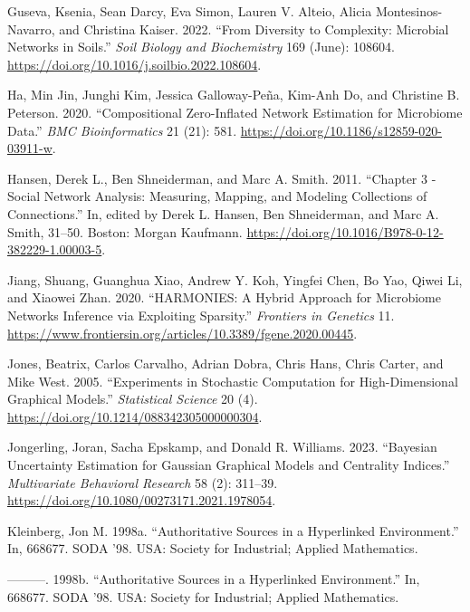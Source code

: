 \documentclass[
  a4paper,
]{article}
\newlength{\cslhangindent}
\newlength{\cslentryspacingunit} %
\newenvironment{CSLReferences}[2] %
 {%
  \setlength{\parindent}{0pt}
  \ifodd #1
  \let\oldpar\par
  \def\par{\hangindent=\cslhangindent\oldpar}
  \fi
  \setlength{\parskip}{#2\cslentryspacingunit}
 }%
 {}
\begin{document}
\begin{CSLReferences}{1}{0}
\leavevmode{}%
Guseva, Ksenia, Sean Darcy, Eva Simon, Lauren V. Alteio, Alicia
Montesinos-Navarro, and Christina Kaiser. 2022. {``From Diversity to
Complexity: Microbial Networks in Soils.''} \emph{Soil Biology and
Biochemistry} 169 (June): 108604.
\url{https://doi.org/10.1016/j.soilbio.2022.108604}.

\leavevmode{}%
Ha, Min Jin, Junghi Kim, Jessica Galloway-Peña, Kim-Anh Do, and
Christine B. Peterson. 2020. {``Compositional Zero-Inflated Network
Estimation for Microbiome Data.''} \emph{BMC Bioinformatics} 21 (21):
581. \url{https://doi.org/10.1186/s12859-020-03911-w}.

\leavevmode{}%
Hansen, Derek L., Ben Shneiderman, and Marc A. Smith. 2011. {``Chapter 3
- Social Network Analysis: Measuring, Mapping, and Modeling Collections
of Connections.''} In, edited by Derek L. Hansen, Ben Shneiderman, and
Marc A. Smith, 31--50. Boston: Morgan Kaufmann.
\url{https://doi.org/10.1016/B978-0-12-382229-1.00003-5}.

\leavevmode{}%
Jiang, Shuang, Guanghua Xiao, Andrew Y. Koh, Yingfei Chen, Bo Yao, Qiwei
Li, and Xiaowei Zhan. 2020. {``HARMONIES: A Hybrid Approach for
Microbiome Networks Inference via Exploiting Sparsity.''}
\emph{Frontiers in Genetics} 11.
\url{https://www.frontiersin.org/articles/10.3389/fgene.2020.00445}.

\leavevmode{}%
Jones, Beatrix, Carlos Carvalho, Adrian Dobra, Chris Hans, Chris Carter,
and Mike West. 2005. {``Experiments in Stochastic Computation for
High-Dimensional Graphical Models.''} \emph{Statistical Science} 20 (4).
\url{https://doi.org/10.1214/088342305000000304}.

\leavevmode{}%
Jongerling, Joran, Sacha Epskamp, and Donald R. Williams. 2023.
{``Bayesian Uncertainty Estimation for Gaussian Graphical Models and
Centrality Indices.''} \emph{Multivariate Behavioral Research} 58 (2):
311--39. \url{https://doi.org/10.1080/00273171.2021.1978054}.

\leavevmode{}%
Kleinberg, Jon M. 1998a. {``Authoritative Sources in a Hyperlinked
Environment.''} In, 668677. SODA '98. USA: Society for Industrial;
Applied Mathematics.

\leavevmode{}%
---------. 1998b. {``Authoritative Sources in a Hyperlinked
Environment.''} In, 668677. SODA '98. USA: Society for Industrial;
Applied Mathematics.


\end{CSLReferences}
\end{document}
